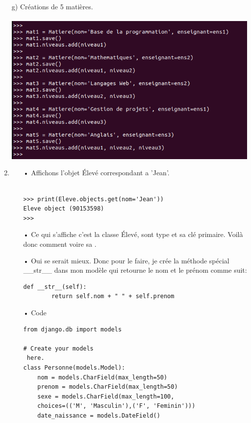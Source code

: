 \documentclass[10pt,a4paper]{article}
\begin{document}
\begin{enumerate}
\item[g)] Créations de 5 matières.\\\\
\includegraphics[scale=0.5]{n4.png}\\



\item 
\begin{itemize}
\item[]

\item[•]Affichons l'objet Élevé correspondant a 'Jean'.\\\\
\begin{verbatim}
>>> print(Eleve.objects.get(nom='Jean'))
Eleve object (90153598)
>>> 
\end{verbatim}
\item[•] Ce qui s'affiche c'est la classe Élevé, sont type et sa clé primaire.
Voilà donc comment voire sa .

\item[•] Oui se serait mieux. Donc pour le faire, je crée la méthode spécial \_\_str\_\_ dans mon modèle qui retourne le nom et le prénom comme suit: \\

\begin{verbatim}
def __str__(self):
        return self.nom + " " + self.prenom
\end{verbatim}

\item[•] Code
\begin{verbatim}
from django.db import models

# Create your models
 here.
class Personne(models.Model):
    nom = models.CharField(max_length=50)
    prenom = models.CharField(max_length=50)
    sexe = models.CharField(max_length=100, 
    choices=(('M', 'Masculin'),('F', 'Feminin'))) 
    date_naissance = models.DateField()


\end{verbatim}
\end{itemize}
\end{enumerate}
\end{document}
